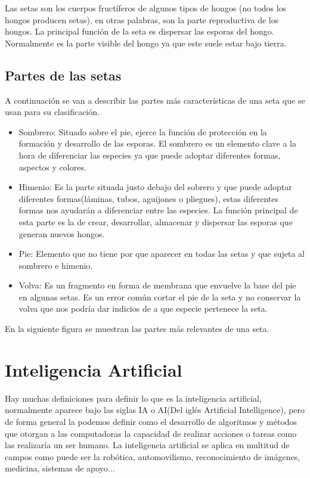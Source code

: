 Las setas son los cuerpos fructíferos de algunos tipos de hongos (no todos los hongos producen setas), en otras palabras, son la parte reproductiva de los hongos. La principal función de la seta es dispersar las esporas del hongo. Normalmente es la parte visible del hongo ya que este suele estar bajo tierra.

\subsection{Partes de las setas}

A continuación se van a describir las partes más características de una seta que se usan para su clasificación.

\begin{itemize}
	\item{Sombrero}: Situado sobre el pie, ejerce la función de protección en la formación y desarrollo de las esporas. El sombrero es un elemento clave a la hora de diferenciar las especies ya que puede adoptar diferentes formas, aspectos y colores.
	\item{Himenio}: Es la parte situada justo debajo del sobrero y que puede adoptar diferentes formas(láminas, tubos, aguijones o pliegues), estas diferentes formas nos ayudarán a diferenciar entre las especies. La función principal de esta parte es la de crear, desarrollar, almacenar y dispersar las esporas que generan nuevos hongos.
	\item{Pie}: Elemento que no tiene por que aparecer en todas las setas y que sujeta al sombrero e himenio.
	\item{Volva}: Es un fragmento en forma de membrana que envuelve la base del pie en algunas setas. Es un error común cortar el pie de la seta y no conservar la volva que nos podría dar indicios de a que especie pertenece la seta.\cite{partesSeta}
\end{itemize}

En la siguiente figura se muestran las partes más relevantes de una seta.

\section{Inteligencia Artificial}
Hay muchas definiciones para definir lo que es la inteligencia artificial, normalmente aparece bajo las siglas IA o AI(Del iglés Artificial Intelligence), pero de forma general la podemos definir como el desarrollo de algoritmos y métodos que otorgan a las computadoras la capacidad de realizar acciones o tareas como las realizaría un ser humano. La inteligencia artificial se aplica en multitud de campos como puede ser la robótica, automovilismo, reconocimiento de imágenes, medicina, sistemas de apoyo...

